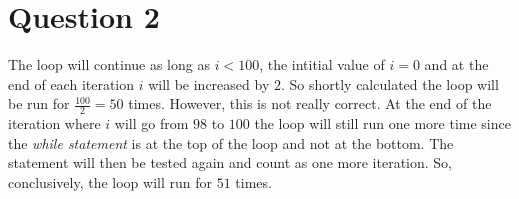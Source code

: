 \section{Question 2}

    The loop will continue as long as $i<100$, the intitial value of $i = 0$ and at the end of each iteration $i$ will be increased by $2$. So shortly calculated the loop will be run for $\frac{100}{2} = 50$ times. However, this is not really correct. At the end of the iteration where $i$ will go from $98$ to $100$ the loop will still run one more time since the \textit{while statement} is at the top of the loop and not at the bottom. The statement will then be tested again and count as one more iteration. So, conclusively, the loop will run for $51$ times.